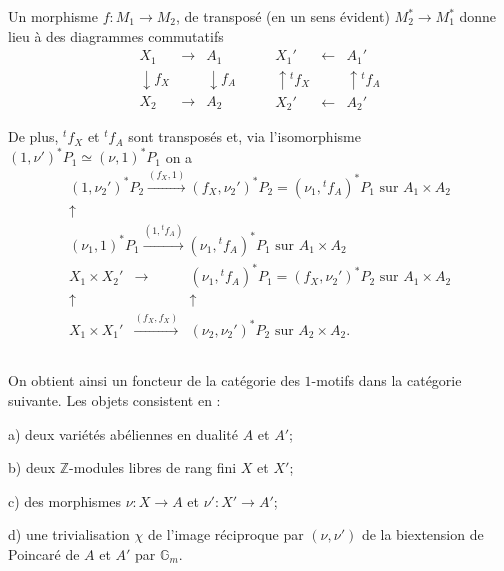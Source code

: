 \documentclass[12pt,a4paper]{amsart}
\theoremstyle{plain}
\theoremstyle{definition}
\theoremstyle{remark}
\numberwithin{equation}{section}
\begin{document}
Un morphisme $f:M_1\to M_2$, de transposé (en un sens évident) $M_2^*\to M_1^*$ donne lieu à des diagrammes commutatifs
\begin{equation}\label{eq:10.2.12.3}
\begin{array}{ccc}
X_1 & \longrightarrow & A_1 \\
\downarrow{f_X} & & \downarrow{f_A} \\
X_2 & \longrightarrow & A_2
\end{array}
\qquad
\begin{array}{ccc}
X_1' & \longleftarrow & A_1' \\
\uparrow{{}^tf_X} & & \uparrow{{}^tf_A} \\
X_2' & \longleftarrow & A_2'
\end{array}
\end{equation}

De plus, ${}^tf_X$ et ${}^tf_A$ sont transposés et, via l'isomorphisme $(1,\nu')^*P_1\simeq(\nu,1)^*P_1$ on a
\[
\begin{array}{c}
(1,\nu_2')^*P_2 \xrightarrow{(f_X,1)} (f_X,\nu_2')^*P_2=(\nu_1,{}^tf_A)^*P_1 \text{ sur } A_1\times A_2 \\
\uparrow \\
(\nu_1,1)^*P_1 \xrightarrow{(1,{}^tf_A)} (\nu_1,{}^tf_A)^*P_1 \text{ sur } A_1\times A_2
\end{array}
\]
\[
\begin{array}{ccc}
X_1\times X_2' & \longrightarrow & (\nu_1,{}^tf_A)^*P_1=(f_X,\nu_2')^*P_2 \text{ sur } A_1\times A_2 \\
\uparrow & & \uparrow \\
X_1\times X_1' & \xrightarrow{(f_X,f_X)} & (\nu_2,\nu_2')^*P_2 \text{ sur } A_2\times A_2.
\end{array}
\]

\subsection{}\label{10.2.13}
On obtient ainsi un foncteur de la catégorie des $1$-motifs dans la catégorie suivante. Les objets consistent en :

a) deux variétés abéliennes en dualité $A$ et $A'$;

b) deux $\mathbb{Z}$-modules libres de rang fini $X$ et $X'$;

c) des morphismes $\nu:X\to A$ et $\nu':X'\to A'$;

d) une trivialisation $\chi$ de l'image réciproque par $(\nu,\nu')$ de la biextension de Poincaré de $A$ et $A'$ par $\mathbb{G}_m$.
\end{document}
